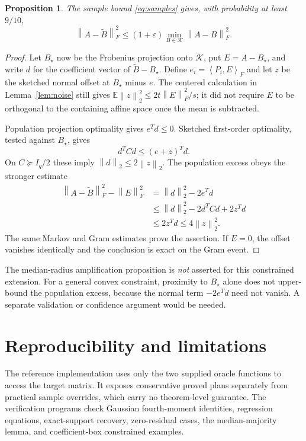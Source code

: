\documentclass[11pt]{article}
\newtheorem{proposition}[theorem]{Proposition}
\theoremstyle{definition}
\newcommand{\E}{\mathbb E}
\newcommand{\norm}[1]{\left\lVert#1\right\rVert}
\newcommand{\ip}[2]{\left\langle#1,#2\right\rangle}
\newcommand{\eps}{\varepsilon}
\begin{document}
\begin{proposition}\label{prop:convex}
The sample bound \eqref{eq:samples} gives, with probability at least $9/10$,
\[
 \norm{A-\widetilde B}_F^2\le(1+\eps)
                  \min_{B\in\mathcal K}\norm{A-B}_F^2.
\]
\end{proposition}
\begin{proof}
Let $B_\star$ now be the Frobenius projection onto $\mathcal K$, put $E=A-B_\star$, and write $d$ for the coefficient vector of $\widetilde B-B_\star$. Define $e_i=\ip{P_i}{E}_F$ and let $z$ be the sketched normal offset at $B_\star$ minus $e$. The centered calculation in Lemma~\ref{lem:noise} still gives $\E\norm z_2^2\le2t\norm E_F^2/s$; it did not require $E$ to be orthogonal to the containing affine space once the mean is subtracted.

Population projection optimality gives $e^Td\le0$. Sketched first-order optimality, tested against $B_\star$, gives
\[
 d^TCd\le(e+z)^Td.
\]
On $C\succeq I_q/2$ these imply $\norm d_2\le2\norm z_2$. The population excess obeys the stronger estimate
\begin{align*}
 \norm{A-\widetilde B}_F^2-\norm E_F^2
 &=\norm d_2^2-2e^Td\\
 &\le\norm d_2^2-2d^TCd+2z^Td\\
 &\le2z^Td\le4\norm z_2^2.
\end{align*}
The same Markov and Gram estimates prove the assertion. If $E=0$, the offset vanishes identically and the conclusion is exact on the Gram event.
\end{proof}

The median-radius amplification proposition is \emph{not} asserted for this constrained extension. For a general convex constraint, proximity to $B_\star$ alone does not upper-bound the population excess, because the normal term $-2e^Td$ need not vanish. A separate validation or confidence argument would be needed.

\section{Reproducibility and limitations}
The reference implementation uses only the two supplied oracle functions to access the target matrix. It exposes conservative proved plans separately from practical sample overrides, which carry no theorem-level guarantee. The verification programs check Gaussian fourth-moment identities, regression equations, exact-support recovery, zero-residual cases, the median-majority lemma, and coefficient-box constrained examples.
\end{document}
